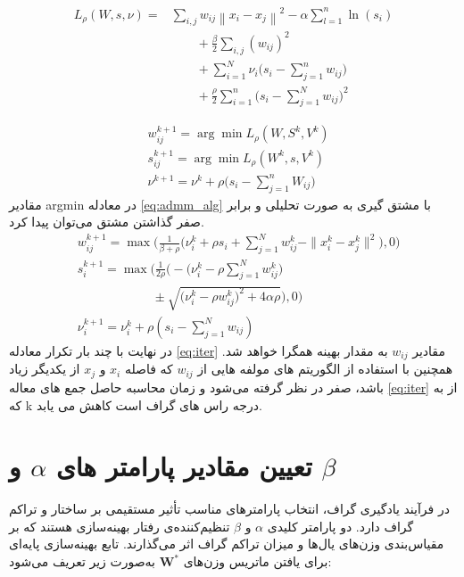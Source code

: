 \documentclass[10pt,twocolumn,a4paper]{article}
\begin{document}
	\begin{equation}\label{eq:opt3}
		\begin{array}{cl}
			L_{\rho} (W, s, \nu) = &\sum_{i,j} w_{ij} \left\| x_i - x_j \right\|^2 - \alpha \sum_{l=1}^{n} \ln (s_i) \\
			&\qquad+ \frac{\beta}{2} \sum_{i,j} (w_{ij})^2 \\
			&\qquad+ \sum_{i=1}^{N} \nu_i \big( s_i - \sum_{j=1}^{n} w_{ij} \big)\\
			&\qquad+ \frac{\rho}{2} \sum_{i=1}^{n} \big( s_i - \sum_{j=1}^{N} w_{ij} \big)^2
		\end{array}
	\end{equation}
	
	\begin{equation}\label{eq:admm_alg}
		\begin{aligned}
			&w_{ij}^{k+1} = \arg\min L_{\rho} (W, S^k, V^k)\\
			&s_{ij}^{k+1} = \arg\min L_{\rho} (W^k, s, V^k)\\
			&\nu^{k+1} = \nu^k + \rho \big( s_i - \sum_{j=1}^{n} W_{ij} \big)
		\end{aligned}
	\end{equation}
	مقادیر argmin در معادله \ref{eq:admm_alg} با مشتق گیری به صورت تحلیلی و برابر صفر گذاشتن مشتق می‌توان پیدا کرد.
	\begin{equation}\label{eq:iter}
		\begin{array}{cl}
			&w_{ij}^{k+1} = \max \big( \frac{1}{\beta + \rho} \big( \nu_i^k + \rho s_i + \sum_{j=1}^{N} w_{ij}^k - \|x_i^k - x_j^k\|^2 \big), 0 \big) \\
			&s_i^{k+1} = \max \Big( \frac{1}{2\rho} \big( -\big( \nu_i^k - \rho \sum_{j=1}^{N} w_{ij}^k \big) \\
			&\qquad\qquad\qquad\pm \sqrt{\big( \nu_i^k - \rho w_{ij}^k \big)^2 + 4\alpha \rho} \big), 0 \Big) \\
			&\nu_i^{k+1} = \nu_i^k + \rho \left( s_i - \sum_{j=1}^{N} w_{ij} \right)
		\end{array}
	\end{equation}
	در نهایت با چند بار تکرار معادله \ref{eq:iter} مقادیر $w_{ij}$ به مقدار بهینه همگرا خواهد شد. همچنین با استفاده از الگوریتم های
	مولفه هایی از $w_{ij}$ که فاصله $x_i$ و $x_j$ از یکدیگر زیاد باشد، صفر در نظر گرفته می‌شود و زمان محاسبه حاصل جمع های معاله \ref{eq:iter} از
	به
	که k درجه راس های گراف است کاهش می یابد.
	
	\section{تعیین مقادیر پارامتر های $\alpha$ و $\beta$}
	در فرآیند یادگیری گراف، انتخاب پارامترهای مناسب تأثیر مستقیمی بر ساختار و تراکم گراف دارد. دو پارامتر کلیدی \( \alpha \) و \( \beta \) تنظیم‌کننده‌ی رفتار بهینه‌سازی هستند که بر مقیاس‌بندی وزن‌های یال‌ها و میزان تراکم گراف اثر می‌گذارند. تابع بهینه‌سازی پایه‌ای برای یافتن ماتریس وزن‌های \( \bm{W}^* \) به‌صورت زیر تعریف می‌شود:
	
\end{document}

